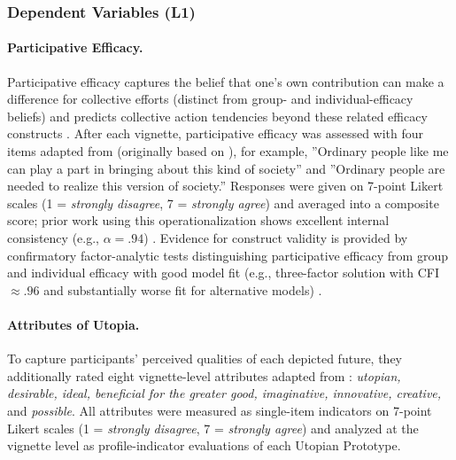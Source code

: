 \documentclass[jou,floatsintext]{apa7}
\begin{document}
\subsubsection{Dependent Variables (L1)}
\label{sec:dvL1}

\paragraph{Participative Efficacy.}
Participative efficacy captures the belief that one’s own contribution can make a difference for collective efforts (distinct from group- and individual-efficacy beliefs) and predicts collective action tendencies beyond these related efficacy constructs \parencite{vanzomerenBelievingMakingDifference2013}. After each vignette, participative efficacy was assessed with four items adapted from \textcite{fernandoGreensSpaceInvaders2020} (originally based on \cite{vanzomerenBelievingMakingDifference2013}), for example, ''Ordinary people like me can play a part in bringing about this kind of society'' and ''Ordinary people are needed to realize this version of society.'' Responses were given on 7-point Likert scales (1 = \textit{strongly disagree}, 7 = \textit{strongly agree}) and averaged into a composite score; prior work using this operationalization shows excellent internal consistency (e.g., $\alpha = .94$) \parencite{fernandoGreensSpaceInvaders2020}. Evidence for construct validity is provided by confirmatory factor-analytic tests distinguishing participative efficacy from group and individual efficacy with good model fit (e.g., three-factor solution with CFI $\approx .96$ and substantially worse fit for alternative models) \parencite{vanzomerenBelievingMakingDifference2013}.

\paragraph{Attributes of Utopia.}
To capture participants’ perceived qualities of each depicted future, they additionally rated eight vignette-level attributes adapted from \textcite{lizzio-wilsonWhatCouldBe2025}: \textit{utopian, desirable, ideal, beneficial for the greater good, imaginative, innovative, creative,} and \textit{possible}. All attributes were measured as single-item indicators on 7-point Likert scales (1 = \textit{strongly disagree}, 7 = \textit{strongly agree}) and analyzed at the vignette level as profile-indicator evaluations of each Utopian Prototype.
\end{document}
